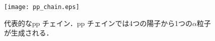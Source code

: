 \documentclass[../master]{subfiles}
\begin{document}
\begin{figure}
  \centering
  \texttt{[image: pp\_chain.eps]}
  \caption{代表的なpp チェイン．pp チェインでは4つの陽子から1つの$\alpha$粒子が生成される．}
  \label{fig::pp_chain}
\end{figure}
\end{document}
